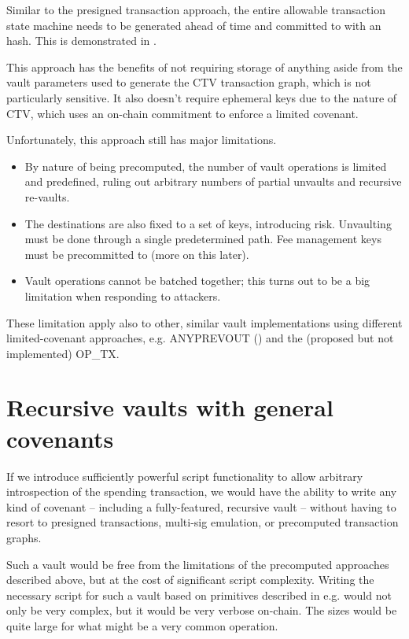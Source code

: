 \documentclass[10pt]{article}
\begin{document}
Similar to the presigned transaction approach, the entire allowable transaction
state machine needs to be generated ahead of time and committed to with an \ctv{} hash. 
This is demonstrated in \cite{OBeirne}.

This approach has the benefits of not requiring storage of anything aside from the vault
parameters used to generate the CTV transaction graph, which is not particularly
sensitive. It also doesn't require ephemeral keys due to the nature of CTV, which uses
an on-chain commitment to enforce a limited covenant.

Unfortunately, this approach still has major limitations. 

\begin{itemize}

  \item By nature of being precomputed, the number of
    vault operations is limited and predefined, ruling out arbitrary numbers of partial
    unvaults and recursive re-vaults. 

  \item The destinations are also fixed to a set of keys, introducing risk. Unvaulting
    must be done through a single predetermined path. Fee management keys must be
    precommitted to (more on this later). 

  \item Vault operations cannot be batched together; this turns out to be a big
    limitation when responding to attackers.

\end{itemize}

These limitation apply also to other, similar vault implementations using different
limited-covenant approaches, e.g. ANYPREVOUT (\cite{APOVaults}) and the (proposed but
not implemented) 
OP\_TX.

\section*{Recursive vaults with general covenants}

If we introduce sufficiently powerful script functionality to allow arbitrary
introspection of the spending transaction, we would have the ability to write any kind
of covenant -- including a fully-featured, recursive vault -- without having to resort
to presigned transactions, multi-sig emulation, or precomputed transaction graphs.

Such a vault would be free from the limitations of the precomputed approaches described
above, but at the cost of significant script complexity. Writing the necessary script
for such a vault based on primitives described in e.g. \cite{ElementsScript} would not
only be very complex, but it would be very verbose on-chain. The \spk{} sizes would be
quite large for what might be a very common operation.
\end{document}
